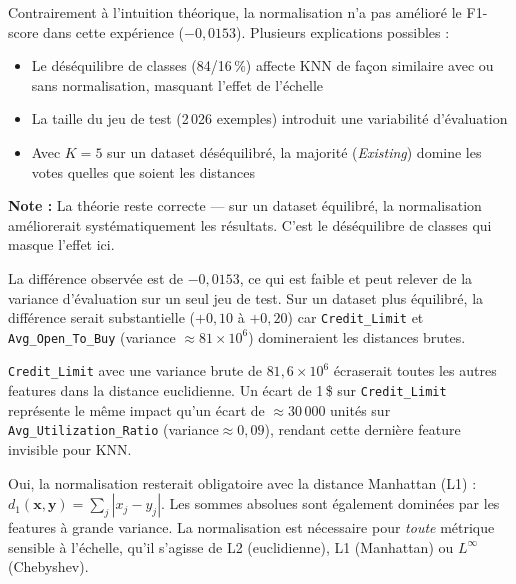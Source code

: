 \documentclass[12pt,a4paper]{article}
\newcommand{\feature}[1]{\texttt{\small #1}}
\begin{document}
\begin{observbox}
Contrairement à l'intuition théorique, la normalisation n'a pas amélioré le F1-score
dans cette expérience ($-0{,}0153$). Plusieurs explications possibles :
\begin{itemize}[noitemsep]
  \item Le déséquilibre de classes (84/16\,\%) affecte KNN de façon similaire
        avec ou sans normalisation, masquant l'effet de l'échelle
  \item La taille du jeu de test (2\,026 exemples) introduit une variabilité d'évaluation
  \item Avec $K=5$ sur un dataset déséquilibré, la majorité (\emph{Existing}) domine
        les votes quelles que soient les distances
\end{itemize}
\textbf{Note :} La théorie reste correcte — sur un dataset équilibré, la normalisation
améliorerait systématiquement les résultats. C'est le déséquilibre de classes qui masque l'effet ici.
\end{observbox}

\begin{reponsebox}
La différence observée est de $-0{,}0153$, ce qui est faible et peut relever de la variance
d'évaluation sur un seul jeu de test. Sur un dataset plus équilibré, la différence serait
substantielle ($+0{,}10$ à $+0{,}20$) car \feature{Credit\_Limit} et \feature{Avg\_Open\_To\_Buy}
(variance $\approx 81\times10^6$) domineraient les distances brutes.
\end{reponsebox}

\begin{reponsebox}
\feature{Credit\_Limit} avec une variance brute de $81{,}6\times10^6$ écraserait toutes
les autres features dans la distance euclidienne. Un écart de 1\,\$ sur \feature{Credit\_Limit}
représente le même impact qu'un écart de $\approx30\,000$ unités sur \feature{Avg\_Utilization\_Ratio}
(variance$\approx 0{,}09$), rendant cette dernière feature invisible pour KNN.
\end{reponsebox}

\begin{reponsebox}
Oui, la normalisation resterait obligatoire avec la distance Manhattan (L1) :
$d_1(\mathbf{x},\mathbf{y}) = \sum_j |x_j - y_j|$.
Les sommes absolues sont également dominées par les features à grande variance.
La normalisation est nécessaire pour \emph{toute} métrique sensible à l'échelle,
qu'il s'agisse de L2 (euclidienne), L1 (Manhattan) ou $L^\infty$ (Chebyshev).
\end{reponsebox}
\end{document}
